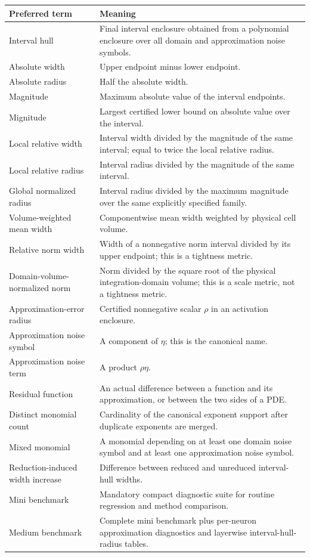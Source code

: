 \documentclass[11pt]{article}
\begin{document}
\renewcommand{\arraystretch}{1.2}
\small
\begin{tabularx}{\textwidth}{@{}l X@{}}
\toprule
Preferred term & Meaning \\
\midrule
Interval hull & Final interval enclosure obtained from a polynomial enclosure over all domain and approximation noise symbols. \\
Absolute width & Upper endpoint minus lower endpoint. \\
Absolute radius & Half the absolute width. \\
Magnitude & Maximum absolute value of the interval endpoints. \\
Mignitude & Largest certified lower bound on absolute value over the interval. \\
Local relative width & Interval width divided by the magnitude of the same interval; equal to twice the local relative radius. \\
Local relative radius & Interval radius divided by the magnitude of the same interval. \\
Global normalized radius & Interval radius divided by the maximum magnitude over the same explicitly specified family. \\
Volume-weighted mean width & Componentwise mean width weighted by physical cell volume. \\
Relative norm width & Width of a nonnegative norm interval divided by its upper endpoint; this is a tightness metric. \\
Domain-volume-normalized norm & Norm divided by the square root of the physical integration-domain volume; this is a scale metric, not a tightness metric. \\
Approximation-error radius & Certified nonnegative scalar \(\rho\) in an activation enclosure. \\
Approximation noise symbol & A component of \(\eta\); this is the canonical name. \\
Approximation noise term & A product \(\rho\eta\). \\
Residual function & An actual difference between a function and its approximation, or between the two sides of a PDE. \\
Distinct monomial count & Cardinality of the canonical exponent support after duplicate exponents are merged. \\
Mixed monomial & A monomial depending on at least one domain noise symbol and at least one approximation noise symbol. \\
Reduction-induced width increase & Difference between reduced and unreduced interval-hull widths. \\
Mini benchmark & Mandatory compact diagnostic suite for routine regression and method comparison. \\
Medium benchmark & Complete mini benchmark plus per-neuron approximation diagnostics and layerwise interval-hull-radius tables. \\
\bottomrule
\end{tabularx}
\normalsize
\end{document}
